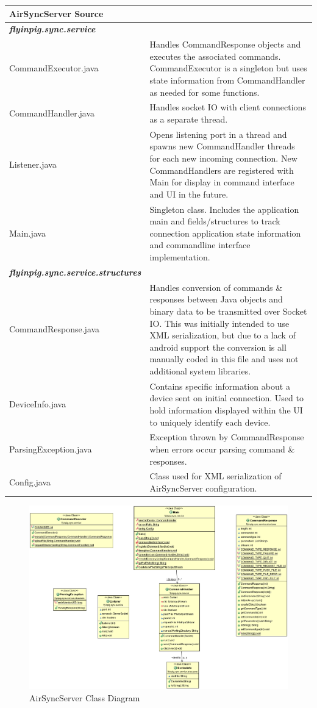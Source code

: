 \documentclass[12pt]{article}
\begin{document}
\begin{center}
\begin{tabular}{|l|p{7.5cm}|}
\hline
	\textbf{AirSyncServer Source} \\
\hline
	\emph{\textbf{flyinpig.sync.service}}\\
\hline 
	CommandExecutor.java
	& Handles CommandResponse objects and executes the associated commands. CommandExecutor is a singleton but uses state information from CommandHandler as needed for some functions.\\
\hline
	CommandHandler.java
	& Handles socket IO with client connections as a separate thread.\\
\hline
	Listener.java
	& Opens listening port in a thread and spawns new CommandHandler threads for each new incoming connection. New CommandHandlers are registered with Main for display in command interface and UI in the future.\\
\hline
	Main.java
	& Singleton class. Includes the application main and fields/structures to track connection application state information and commandline interface implementation.\\
\hline
	\emph{\textbf{flyinpig.sync.service.structures}}\\
\hline
	CommandResponse.java
	& Handles conversion of commands \& responses between Java objects and binary data to be transmitted over Socket IO. This was initially intended to use XML serialization, but due to a lack of android support the conversion is all manually coded in this file and uses not additional system libraries.\\
\hline
	DeviceInfo.java
	& Contains specific information about a device sent on initial connection. Used to hold information displayed within the UI to uniquely identify each device.\\
\hline
	ParsingException.java
	& Exception thrown by CommandResponse when errors occur parsing command \& responses.\\
\hline
	Config.java
	& Class used for XML serialization of AirSyncServer configuration.\\
\hline
\end{tabular}
\end{center}

\begin{figure}[H]
\center
\includegraphics[width=.9\textwidth]{class-diag.png}
\caption{AirSyncServer Class Diagram}
\end{figure}
\end{document}
